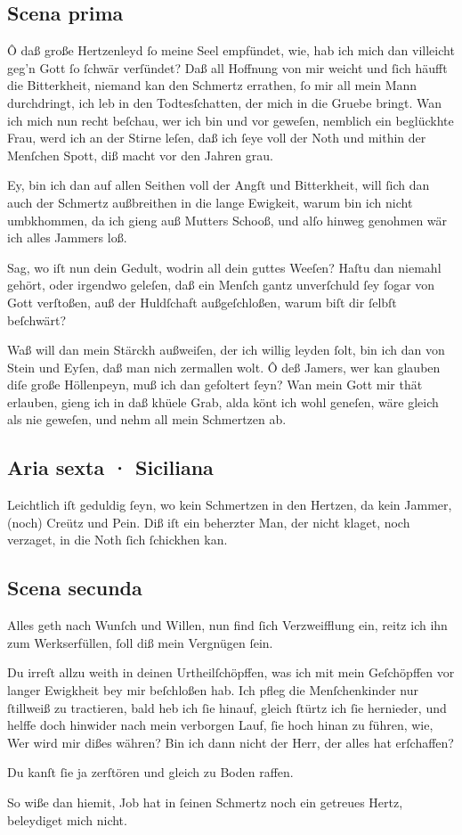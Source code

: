 \documentclass{ees}
\newenvironment{lyrics}[1]{%
  \subsection{#1}\nopagebreak%
  \begin{lyricslist}%
  \let\voice\item%
}{%
  \end{lyricslist}%
}
\begin{document}
\begin{lyrics}{Scena prima}
  \voice[Jobs Frau]
  Ô daß große Hertzenleyd
  ſo meine Seel empfündet,
  wie, hab ich mich dan villeicht
  geg’n Gott ſo ſchwär verſündet?
  Daß all Hoffnung von mir weicht
  und ſich häufft die Bitterkheit,
  niemand kan den Schmertz errathen,
  ſo mir all mein Mann durchdringt,
  ich leb in den Todtesſchatten,
  der mich in die Gruebe bringt.
  Wan ich mich nun recht beſchau,
  wer ich bin und vor geweſen,
  nemblich ein beglückhte Frau,
  werd ich an der Stirne leſen,
  daß ich ſeye voll der Noth
  und mithin der Menſchen Spott,
  diß macht vor den Jahren grau.

  \voice[Job]
  Ey, bin ich dan auf allen Seithen
  voll der Angſt und Bitterkheit,
  will ſich dan auch der Schmertz außbreithen
  in die lange Ewigkeit,
  warum bin ich nicht umbkhommen,
  da ich gieng auß Mutters Schooß,
  und alſo hinweg genohmen
  wär ich alles Jammers loß.

  \voice[Eliphas]
  Sag, wo iſt nun dein Gedult,
  wodrin all dein guttes Weeſen?
  Haſtu dan niemahl gehört,
  oder irgendwo geleſen,
  daß ein Menſch gantz unverſchuld
  ſey ſogar von Gott verſtoßen,
  auß der Huldſchaft außgeſchloßen,
  warum biſt dir ſelbſt beſchwärt?

  \voice[Job]
  Waß will dan mein Stärckh außweiſen,
  der ich willig leyden ſolt,
  bin ich dan von Stein und Eyſen,
  daß man nich zermallen wolt.
  Ô deß Jamers, wer kan glauben
  diſe große Höllenpeyn,
  muß ich dan gefoltert ſeyn?
  Wan mein Gott mir thät erlauben,
  gieng ich in daß khüele Grab,
  alda könt ich wohl geneſen,
  wäre gleich als nie geweſen,
  und nehm all mein Schmertzen ab.
\end{lyrics}

\begin{lyrics}{Aria sexta · Siciliana}
  \voice[Job]
  Leichtlich iſt geduldig ſeyn,
  wo kein Schmertzen
  in den Hertzen,
  da kein Jammer, (noch) Creütz und Pein.
  Diß iſt ein beherzter Man,
  der nicht klaget,
  noch verzaget,
  in die Noth ſich ſchickhen kan.
\end{lyrics}

\begin{lyrics}{Scena secunda}
  \voice[Leviathan]
  Alles geth nach Wunſch und Willen,
  nun find ſich Verzweifflung ein,
  reitz ich ihn zum Werkserfüllen,
  ſoll diß mein Vergnügen ſein.

  \voice[Schöpffer]
  Du irreſt allzu weith
  in deinen Urtheilſchöpffen,
  was ich mit mein Geſchöpffen
  vor langer Ewigkheit
  bey mir beſchloßen hab.
  Ich pfleg die Menſchenkinder
  nur ſtillweiß zu tractieren,
  bald heb ich ſie hinauf,
  gleich ſtürtz ich ſie hernieder,
  und helffe doch hinwider
  nach mein verborgen Lauf,
  ſie hoch hinan zu führen, wie,
  Wer wird mir dißes währen?
  Bin ich dann nicht der Herr,
  der alles hat erſchaffen?

  \voice[Leviathan]
  Du kanſt ſie ja zerſtören
  und gleich zu Boden raffen.

  \voice[Schöpffer]
  So wiße dan hiemit,
  Job hat in ſeinen Schmertz
  noch ein getreues Hertz,
  beleydiget mich nicht.
\end{lyrics}
\end{document}
